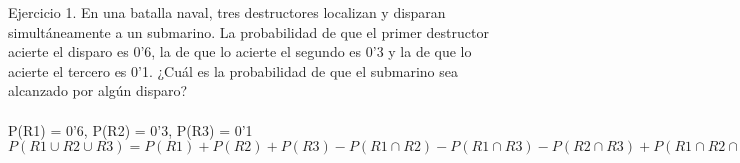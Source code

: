 Ejercicio 1. En una batalla naval, tres destructores localizan y disparan simultáneamente a un submarino. La probabilidad de que el primer destructor acierte el disparo es 0'6, la de que lo acierte el segundo es 0'3 y la de que lo acierte el tercero es 0'1. ¿Cuál es la probabilidad de que el submarino sea alcanzado por algún disparo? \\ \\
P(R1) = 0'6, P(R2) = 0'3, P(R3) = 0'1 \\
$P(R1 \cup R2 \cup R3) = P(R1) + P(R2) + P(R3) - P(R1 \cap R2) - P(R1 \cap R3) - P(R2 \cap R3) + P(R1 \cap R2 \cap R3) = 0'6+0'3+0'1-(0'6*0'1)-(0'6*0'3)-(0'1*0'3)+(0'6*0'3*0'1) = 0'748 $\\